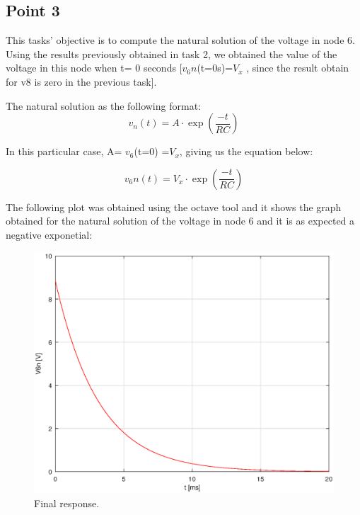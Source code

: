 \subsection{Point 3}

This tasks' objective is to compute the natural solution of the voltage in node 6. Using the results previously obtained in task 2, we  obtained the value of the voltage in this node when t= 0 seconds [$v_6n$(t=0s)=$V_x$ , since the result obtain for v8 is zero in the previous task].
\par The natural solution as the following format:
\begin{equation}
v_n(t) = A \cdot \exp(\frac{-t}{RC})
\end{equation}

In this particular case, A= $v_6$(t=0) =$V_x$, giving us the equation below:

\begin{equation}
v_6n(t) = V_x \cdot \exp(\frac{-t}{RC})
\end{equation}

The following plot was obtained using the octave tool and it shows the graph obtained for the natural solution of the voltage in node 6 and it is
as expected a negative exponetial:
\begin{figure}[H] \centering
\includegraphics[width=0.6\linewidth]{theoretical.eps}
\caption{Final response.}
\label{fig:point3}
\end{figure}

